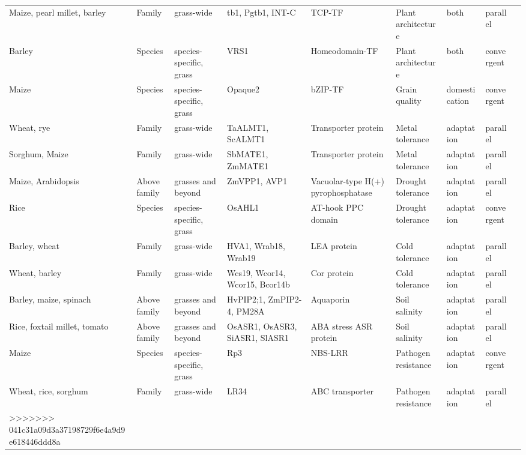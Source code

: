 \documentclass[12pt]{article}
\begin{document}
\begin{table}
\begin{center}
\begin{tabular}{G{3.5cm}G{2.5cm}C{3.10cm}C{3.5cm}C{1.95cm}G{2.0cm}G{1.8cm}G{1.5cm}G{1.5cm}}
Maize, pearl millet, barley & Family & grass-wide & tb1, Pgtb1, INT-C & TCP-TF & Plant architecture & both & parallel & \citep{Studer2011, Remigereau2011, Ramsay2011}\\
Barley & Species & species-specific, grass & VRS1 & Homeodomain-TF & Plant architecture & both & convergent & \citep{Martin2013}\\
Maize & Species & species-specific, grass & Opaque2 & bZIP-TF & Grain quality & domestication & convergent & \citep{Martin2013}\\
Wheat, rye & Family & grass-wide & TaALMT1, ScALMT1 & Transporter protein & Metal tolerance & adaptation & parallel & \citep{Martin2013}\\
Sorghum, Maize & Family & grass-wide & SbMATE1, ZmMATE1 & Transporter protein & Metal tolerance & adaptation & parallel & \citep{Martin2013}\\
Maize, Arabidopsis & Above family & grasses and beyond & ZmVPP1, AVP1 & Vacuolar-type H(+) pyrophosphatase & Drought tolerance & adaptation & parallel & \citep{Wang2016}\\
Rice & Species & species-specific, grass & OsAHL1 & AT-hook PPC domain & Drought tolerance & adaptation & convergent & \citep{Zhou2016}\\
Barley, wheat & Family & grass-wide & HVA1, Wrab18, Wrab19 & LEA protein & Cold tolerance & adaptation & parallel & \citep{Hong1988, pmid16755132}\\
Wheat, barley & Family & grass-wide & Wcs19, Wcor14, Wcor15, Bcor14b & Cor protein & Cold tolerance & adaptation & parallel & \citep{Takumi2003}\\
Barley, maize, spinach & Above family & grasses and beyond & HvPIP2;1, ZmPIP2-4, PM28A & Aquaporin & Soil salinity & adaptation & parallel & \citep{Katsuhara2002, Zhu2005, Fotiadis2000}\\
Rice, foxtail millet, tomato & Above family & grasses and beyond & OsASR1, OsASR3, SiASR1, SlASR1 & ABA stress ASR protein & Soil salinity & adaptation & parallel & \citep{Li2017, Konrad2008}\\
Maize & Species & species-specific, grass & Rp3 & NBS-LRR & Pathogen resistance & adaptation & convergent & \citep{pmid12242248}\\
Wheat, rice, sorghum & Family & grass-wide & LR34 & ABC transporter & Pathogen resistance & adaptation & parallel & \citep{Krattinger2010}\\
>>>>>>> 041c31a09d3a37198729f6e4a9d9e618446ddd8a
\end{tabular}
\end{center}
\end{table}
\end{document}
